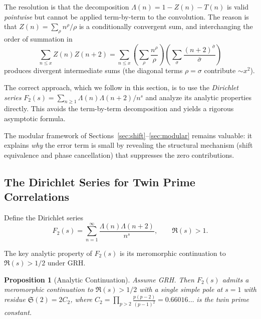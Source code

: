 \documentclass[11pt,a4paper]{article}
\newtheorem{proposition}[theorem]{Proposition}
\theoremstyle{remark}
\newcommand{\tw}{\mathfrak{S}}
\begin{document}
The resolution is that the decomposition $\Lambda(n) = 1 - Z(n) - T(n)$ is valid \emph{pointwise} but cannot be applied term-by-term to the convolution. The reason is that $Z(n) = \sum_\rho n^\rho/\rho$ is a conditionally convergent sum, and interchanging the order of summation in
\[
\sum_{n\le x} Z(n)Z(n+2) = \sum_{n\le x}\left(\sum_\rho \frac{n^\rho}{\rho}\right)\left(\sum_\sigma \frac{(n+2)^{\bar\sigma}}{\bar\sigma}\right)
\]
produces divergent intermediate sums (the diagonal terms $\rho = \sigma$ contribute $\sim x^2$).

The correct approach, which we follow in this section, is to use the \emph{Dirichlet series} $F_2(s) = \sum_{n\ge 1} \Lambda(n)\Lambda(n+2)/n^s$ and analyze its analytic properties directly. This avoids the term-by-term decomposition and yields a rigorous asymptotic formula.

The modular framework of Sections~\ref{sec:shift}--\ref{sec:modular} remains valuable: it explains \emph{why} the error term is small by revealing the structural mechanism (shift equivalence and phase cancellation) that suppresses the zero contributions.

\subsection{The Dirichlet Series for Twin Prime Correlations}

Define the Dirichlet series
\begin{equation}\label{eq:F2_def}
F_2(s) = \sum_{n=1}^{\infty} \frac{\Lambda(n)\Lambda(n+2)}{n^s}, \qquad \Re(s) > 1.
\end{equation}

The key analytic property of $F_2(s)$ is its meromorphic continuation to $\Re(s) > 1/2$ under GRH.

\begin{proposition}[Analytic Continuation]\label{prop:analytic}
Assume GRH. Then $F_2(s)$ admits a meromorphic continuation to $\Re(s) > 1/2$ with a single simple pole at $s=1$ with residue $\tw(2) = 2C_2$, where $C_2 = \prod_{p>2} \frac{p(p-2)}{(p-1)^2} = 0.66016\ldots$ is the twin prime constant.
\end{proposition}
\end{document}
